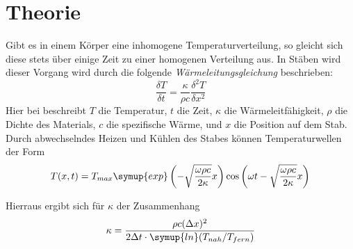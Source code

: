 \section{Theorie}
\label{sec:Theorie}
Gibt es in einem Körper eine inhomogene Temperaturverteilung, so gleicht sich diese stets über einige Zeit zu einer homogenen Verteilung aus. In Stäben wird dieser Vorgang wird durch die folgende \textit{Wärmeleitungsgleichung} beschrieben:
\begin{equation}
  \frac{\delta T}{\delta t} = \frac{\kappa}{\rho c} \frac{\delta^2 T}{\delta x^2}
  \label{eqn:T}
\end{equation}
Hier bei beschreibt $T$ die Temperatur, $t$ die Zeit, $\kappa$ die Wärmeleitfähigkeit, $\rho$ die Dichte des Materials, $c$ die spezifische Wärme, und $x$ die Position auf dem Stab.
Durch abwechselndes Heizen und Kühlen des Stabes können Temperaturwellen der Form
\begin{equation}
  T(x,t) = T_{max} \symup{exp}\left(-\sqrt{\frac{\omega \rho c}{2\kappa}}x \right) \cos\left(\omega t - \sqrt{\frac{\omega \rho c}{2 \kappa}}x \right)
  \label{eqn:Welle}
\end{equation}

Hierraus ergibt sich für $\kappa$ der Zusammenhang
\begin{equation}
  \kappa = \frac{\rho c (\Delta x)^2}{2 \Delta t \cdot \symup{ln}(T_{nah}/T_{fern})}
  \label{eqn:kappa}
\end{equation}
